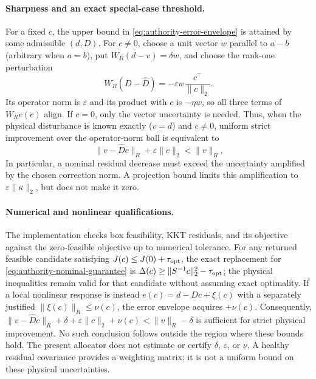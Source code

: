 \paragraph{Sharpness and an exact special-case threshold.}
For a fixed $c$, the upper bound in
\eqref{eq:authority-error-envelope} is attained by some admissible $(d,D)$.
For $c\ne0$, choose a unit vector $w$ parallel to $a-b$ (arbitrary when
$a=b$), put $W_R(d-v)=\delta w$, and choose the rank-one perturbation
\[
 W_R(D-\widehat D)=-\varepsilon w\frac{c^\top}{\|c\|_2}.
\]
Its operator norm is $\varepsilon$ and its product with $c$ is $-\eta w$,
so all three terms of $W_R e(c)$ align. If $c=0$, only the vector uncertainty
is needed. Thus, when the physical disturbance is known exactly ($v=d$)
and $c\ne0$, uniform strict improvement over the operator-norm ball is
equivalent to
\begin{equation}
 \|v-\widehat D c\|_R+\varepsilon\|c\|_2<\|v\|_R.
 \label{eq:authority-sharp-threshold}
\end{equation}
In particular, a nominal residual decrease must exceed the uncertainty
amplified by the chosen correction norm. A projection bound limits this
amplification to $\varepsilon\|\kappa\|_2$, but does not make it zero.

\paragraph{Numerical and nonlinear qualifications.}
The implementation checks box feasibility, KKT residuals, and its objective
against the zero-feasible objective up to numerical tolerance. For any
returned feasible candidate satisfying $J(c)\leq J(0)+\tau_{\rm opt}$,
the exact replacement for \eqref{eq:authority-nominal-guarantee} is
$\Delta(c)\geq\|S^{-1}c\|_2^2-\tau_{\rm opt}$; the physical inequalities
remain valid for that candidate without assuming exact optimality.
If a local nonlinear response is instead
$e(c)=d-Dc+\xi(c)$ with a separately justified
$\|\xi(c)\|_R\leq\nu(c)$, the error envelope acquires $+\nu(c)$.
Consequently, $\|v-\widehat D c\|_R+\delta+\varepsilon\|c\|_2+\nu(c)
<\|v\|_R-\delta$ is sufficient for strict physical improvement.
No such conclusion follows outside the region where these bounds hold.
The present allocator does not estimate or certify $\delta$, $\varepsilon$,
or $\nu$. A healthy residual covariance provides a weighting matrix; it is
not a uniform bound on these physical uncertainties.

